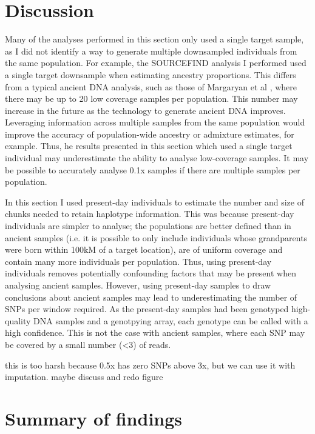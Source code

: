 \section{Discussion}

Many of the analyses performed in this section only used a single target sample, as I did not identify a way to generate multiple downsampled individuals from the same population. For example, the SOURCEFIND analysis I performed  used a single target downsample when estimating ancestry proportions. This differs from a typical ancient DNA analysis, such as those of Margaryan et al \cite{margaryan2020population}, where there may be up to 20 low coverage samples per population. This number may increase in the future as the technology to generate ancient DNA improves. Leveraging information across multiple samples from the same population  would improve the accuracy of population-wide ancestry or admixture estimates, for example. Thus, he results presented in this section which used a single target individual may underestimate the ability to analyse low-coverage samples. It may be possible to accurately analyse 0.1x samples if there are multiple samples per population. 

In this section I used present-day individuals to estimate the number and size of chunks needed to retain haplotype information. This was because present-day individuals are simpler to analyse; the populations are better defined than in ancient samples (i.e. it is possible to only include individuals whose grandparents were born within 100kM of a target location), are of uniform coverage and contain many more individuals per population. Thus, using present-day individuals removes potentially confounding factors that may be present when analysing ancient samples. However, using present-day samples to draw conclusions about ancient samples may lead to underestimating the number of SNPs per window required. As the present-day samples had been genotyped high-quality DNA samples and a genotpying array, each genotype can be called with a high confidence. This is not the case with ancient samples, where each SNP may be covered by a small number (<3) of reads.

this is too harsh because 0.5x has zero SNPs above 3x, but we can use it with imputation. maybe discuss and redo figure

\section{Summary of findings}


